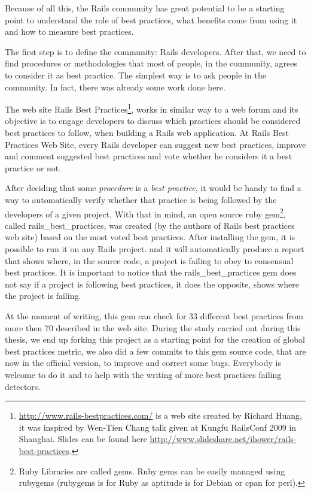 Because of all this, the Rails community has great potential to be a starting point to understand the role of best practices, 
what benefits come from using it and how to measure best practices.

The first step is to define the community: Rails developers. 
After that, we need to find procedures or methodologies that most of people, in the community, agrees to consider it as best practice.
The simplest way is to ask people in the community. 
In fact, there was already some work done here.

The web site
\textsf{Rails Best Practices}\footnote{\url{http://www.rails-bestpractices.com/} is a web site created by Richard Huang,
it was inspired by Wen-Tien Chang talk given at Kungfu RailsConf 2009 in Shanghai. Slides can be found here
\url{http://www.slideshare.net/ihower/rails-best-practices}.},
works in similar way to a web forum and its objective is to engage developers to discuss which practices
should be considered best practices to follow, when building a Rails web application.
At Rails Best Practices Web Site, every Rails developer can suggest new best practices,
improve and comment suggested best practices and vote whether he considers it a best practice or not.

After deciding that some \emph{procedure} is a \emph{best practice},
it would be handy to find a way to automatically verify whether 
that practice is being followed by the developers of a given project.
With that in mind, an open source ruby 
\textsf{gem}\footnote{
  Ruby Libraries are called gems. Ruby gems can be easily managed using rubygems 
  (rubygems is for Ruby as aptitude is for Debian or cpan for perl).
}, 
called rails\_best\_practices, was created (by the authors of Rails best practices web site) 
based on the most voted best practices. 
After installing the gem, it is possible to run it on any Rails project.
and it will automatically produce a report that shows where,
in the source code, a project is failing to obey to consensual best practices.
It is important to notice that the rails\_best\_practices gem does not say if a project is following best practices,
it does the opposite, shows where the project is failing.

At the moment of writing, this gem can check for 33 different best practices from more then 70 described in the web site.
During the study carried out during this thesis, 
we end up forking this project as a starting point for the creation of global best practices metric,
we also did a few commits to this gem source code, that are now in the official version, to improve and correct some bugs. 
Everybody is welcome to do it and to help with the writing of more best practices failing detectors.



